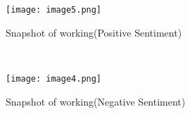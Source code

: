 \documentclass[12pt]{article}
\begin{document}
\begin{Center}
 
\end{Center}\par

\begin{Center}
 
\end{Center}\par

\setlength{\parskip}{12.0pt}
\begin{Center}



\begin{figure}[H]
	\begin{Center}
		\texttt{[image: image5.png]}
		\caption{Snapshot of working(Positive Sentiment)}
		\label{fig:Snapshot of working(Positive Sentiment)}
	\end{Center}
\end{figure}



\\
{\fontsize{11pt}{13.2pt}\selectfont \textbf{\textit{}}\par}
\end{Center}\par

\begin{Center}



\begin{figure}[H]
	\begin{Center}
		\texttt{[image: image4.png]}
		\caption{Snapshot of working(Negative Sentiment)}
		\label{fig:Snapshot of working(Negative Sentiment)}
	\end{Center}
\end{figure}



\\
\textbf{\textit{}}
\end{Center}\par


\vspace{\baselineskip}

\vspace{\baselineskip}
\end{document}
